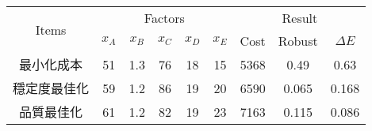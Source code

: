 \begin{tabular}{ccccccccc}
\hline
\multirow{2}{*}{Items} &
\multicolumn{5}{c}{Factors} &
\multicolumn{3}{c}{\multirow{1}{*}{Result}} \\
\cline{2-9}
  & $x_A$ & $x_B$ & $x_C$ & $x_D$ & $x_E$ & Cost & Robust & $\Delta E$ \\
\hline\hline
最小化成本 & 51 & 1.3 & 76 & 18 & 15 & 5368 & 0.49 & 0.63 \\ 
穩定度最佳化 & 59 & 1.2 & 86 & 19 & 20 & 6590 & 0.065 & 0.168 \\ 
品質最佳化 & 61 & 1.2 & 82 & 19 & 23 & 7163 & 0.115 & 0.086 \\ 
\hline
\end{tabular}